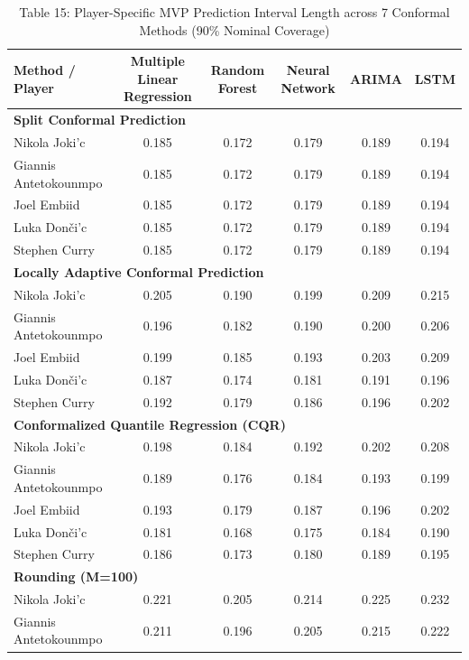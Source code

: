 \documentclass[11pt,a4paper]{article}
\begin{document}
\begin{table}[H]
\centering
\caption{Table 15: Player-Specific MVP Prediction Interval Length across 7 Conformal Methods (90\% Nominal Coverage)}
\label{tab:mvp_star_len_90}
\scriptsize
\begin{tabular}{lccccc}
\toprule
Method / Player & Multiple Linear Regression & Random Forest & Neural Network & ARIMA & LSTM \\
\midrule
\multicolumn{6}{l}{\textbf{Split Conformal Prediction}} \\
\midrule
Nikola Joki'{c} & 0.185 & 0.172 & 0.179 & 0.189 & 0.194 \\
Giannis Antetokounmpo & 0.185 & 0.172 & 0.179 & 0.189 & 0.194 \\
Joel Embiid & 0.185 & 0.172 & 0.179 & 0.189 & 0.194 \\
Luka Don\v{c}i'{c} & 0.185 & 0.172 & 0.179 & 0.189 & 0.194 \\
Stephen Curry & 0.185 & 0.172 & 0.179 & 0.189 & 0.194 \\
\midrule
\multicolumn{6}{l}{\textbf{Locally Adaptive Conformal Prediction}} \\
\midrule
Nikola Joki'{c} & 0.205 & 0.190 & 0.199 & 0.209 & 0.215 \\
Giannis Antetokounmpo & 0.196 & 0.182 & 0.190 & 0.200 & 0.206 \\
Joel Embiid & 0.199 & 0.185 & 0.193 & 0.203 & 0.209 \\
Luka Don\v{c}i'{c} & 0.187 & 0.174 & 0.181 & 0.191 & 0.196 \\
Stephen Curry & 0.192 & 0.179 & 0.186 & 0.196 & 0.202 \\
\midrule
\multicolumn{6}{l}{\textbf{Conformalized Quantile Regression (CQR)}} \\
\midrule
Nikola Joki'{c} & 0.198 & 0.184 & 0.192 & 0.202 & 0.208 \\
Giannis Antetokounmpo & 0.189 & 0.176 & 0.184 & 0.193 & 0.199 \\
Joel Embiid & 0.193 & 0.179 & 0.187 & 0.196 & 0.202 \\
Luka Don\v{c}i'{c} & 0.181 & 0.168 & 0.175 & 0.184 & 0.190 \\
Stephen Curry & 0.186 & 0.173 & 0.180 & 0.189 & 0.195 \\
\midrule
\multicolumn{6}{l}{\textbf{Rounding (M=100)}} \\
\midrule
Nikola Joki'{c} & 0.221 & 0.205 & 0.214 & 0.225 & 0.232 \\
Giannis Antetokounmpo & 0.211 & 0.196 & 0.205 & 0.215 & 0.222 \\

\end{tabular}
\end{table}
\end{document}
